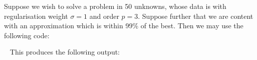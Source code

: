 \documentclass{galahad}
\begin{document}

\galexample
Suppose we wish to solve a problem in 50 unknowns, whose data is 
with regularisation weight $\sigma = 1$ and order $p = 3$.
Suppose further that we are content with 
an approximation which is within 99\% of the best.
Then we may use the following code:

{\tt \small
\VerbatimInput{\packageexample}
}
\noindent
This produces the following output:
{\tt \small
\VerbatimInput{\packageresults}
}
\end{document}
